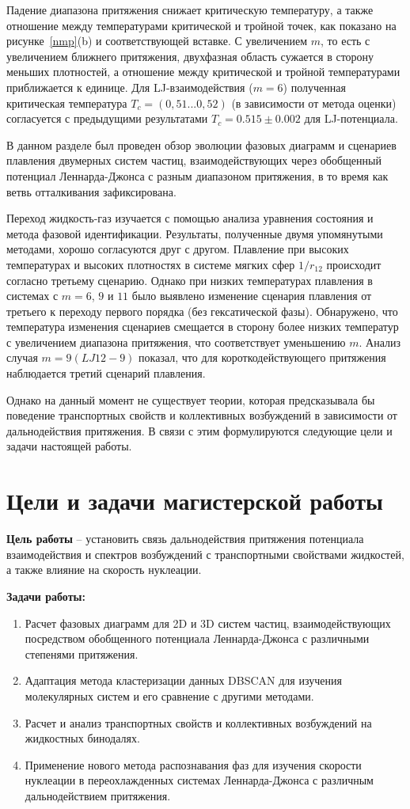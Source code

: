 Падение диапазона притяжения снижает критическую температуру, а также отношение между температурами критической и тройной точек, как показано на рисунке~\ref{nmp}(b) и соответствующей вставке. 
С увеличением $m$, то есть с увеличением ближнего притяжения, двухфазная область сужается в сторону меньших плотностей, а отношение между критической и тройной температурами приближается к единице. 
Для LJ-взаимодействия ($m = 6$) полученная критическая температура $T_c=(0,51 . . . 0,52)$ (в зависимости от метода оценки) согласуется с предыдущими результатами $T_c = 0.515 \pm 0.002$  для LJ-потенциала.

В данном разделе был проведен обзор эволюции фазовых диаграмм и сценариев плавления двумерных систем частиц, взаимодействующих через обобщенный потенциал Леннарда-Джонса с разным диапазоном притяжения, в то время как ветвь отталкивания зафиксирована.

Переход жидкость-газ изучается с помощью анализа уравнения состояния и метода фазовой идентификации.
Результаты, полученные двумя упомянутыми методами, хорошо согласуются друг с другом.
Плавление при высоких температурах и высоких плотностях в системе мягких сфер $1/r_{12}$ происходит согласно третьему сценарию. 
Однако при низких температурах плавления в системах с $m = 6$, $9$ и $11$ было выявлено изменение сценария плавления от третьего к переходу первого порядка (без гексатической фазы).
Обнаружено, что температура изменения сценариев смещается в сторону более низких температур с увеличением диапазона притяжения, что соответствует уменьшению $m$. 
Анализ случая $m = 9 (LJ12-9)$  показал, что для короткодействующего притяжения наблюдается третий сценарий плавления.

Однако на данный момент не существует теории, которая предсказывала бы поведение транспортных свойств и коллективных возбуждений в зависимости от дальнодействия притяжения.
В связи с этим формулируются следующие цели и задачи настоящей работы.

\section{Цели и задачи магистерской работы}

\textbf{Цель работы} -- установить связь дальнодействия притяжения потенциала взаимодействия и спектров возбуждений с транспортными свойствами жидкостей, а также влияние на скорость нуклеации.

\textbf{Задачи работы:}
\begin{enumerate}
    \item Расчет фазовых диаграмм для 2D и 3D систем частиц, взаимодействующих посредством обобщенного потенциала Леннарда-Джонса с различными степенями притяжения.
    \item Адаптация метода кластеризации данных DBSCAN для изучения молекулярных систем и его сравнение с другими методами.
    \item Расчет и анализ транспортных свойств и коллективных возбуждений на жидкостных бинодалях.
    \item Применение нового метода распознавания фаз для изучения скорости нуклеации в переохлажденных системах Леннарда-Джонса с различным дальнодействием притяжения.
\end{enumerate}
